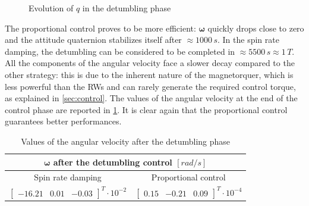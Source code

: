 \begin{figure}[h!]
    \centering
    \caption{Evolution of $q$ in the detumbling phase}
    \label{fig:detumbling-q}
\end{figure}

The proportional control proves to be more efficient: $\bm{\omega}$ quickly drops close to zero and the attitude quaternion stabilizes itself after $\approx 1000 \, s$. In the spin rate damping, the detumbling can be considered to be completed in $\approx 5500 \, s \approx 1\, T$. All the components of the angular velocity face a slower decay compared to the other strategy: this is due to the inherent nature of the magnetorquer, which is less powerful than the RWs and can rarely generate the required control torque, as explained in \cref{sec:control}. The values of the angular velocity at the end of the control phase are reported in \cref{tab:detumbling_finalW}. It is clear again that the proportional control guarantees better performances.

\begin{table}[h!]
    \centering
    \caption{Values of the angular velocity after the detumbling phase}
    \begin{tabular}{cc}
    \toprule
    \toprule
    \multicolumn{2}{c}{\textbf{$\bm{\omega}$ after the detumbling control} $[rad/s]$} \\
    \midrule
    Spin rate damping & Proportional control \\
    \midrule
    $\begin{bmatrix} -16.21 & 0.01 & -0.03 \end{bmatrix}^T \cdot 10^{-2}$  &  $\begin{bmatrix} 0.15 & -0.21 & 0.09 \end{bmatrix}^T \cdot 10^{-4}$ \\
    \bottomrule
    \bottomrule
    \end{tabular}
    \label{tab:detumbling_finalW}
\end{table}

